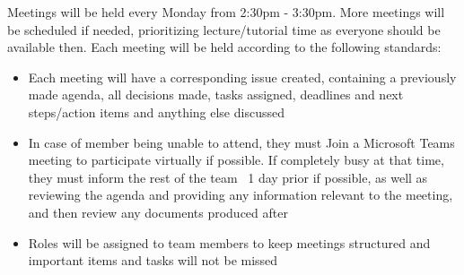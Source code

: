 Meetings will be held every Monday from 2:30pm - 3:30pm. More meetings will be 
scheduled if needed, prioritizing lecture/tutorial time as everyone should be 
available then. Each meeting will be held according to the following standards:
\begin{itemize}
\item Each meeting will have a corresponding issue created, containing a previously made agenda, all decisions made, tasks assigned, deadlines and next steps/action items and anything else discussed
\item In case of member being unable to attend, they must Join a Microsoft Teams meeting to participate virtually if possible. If completely busy at that time, they must inform the rest of the team ~1 day prior if possible, as well as reviewing the agenda and providing any information relevant to the meeting, and then review any documents produced after
\item Roles will be assigned to team members to keep meetings structured and important items and tasks will not be missed
\end{itemize}